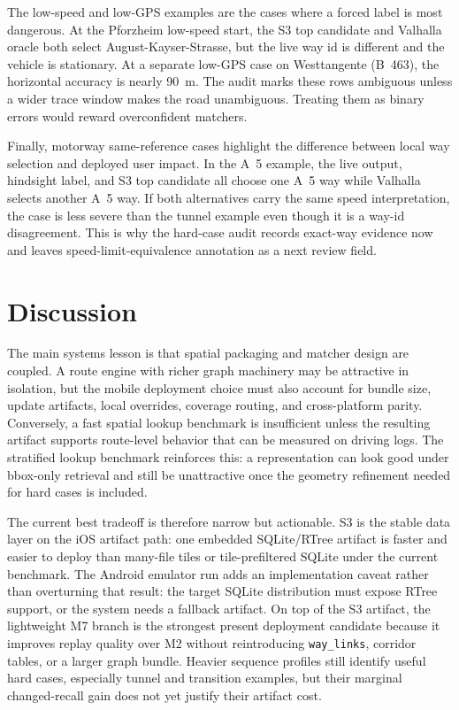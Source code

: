 \documentclass[sigconf]{acmart}
\begin{document}
The low-speed and low-GPS examples are the cases where a forced label is most dangerous. At the Pforzheim low-speed start, the S3 top candidate and Valhalla oracle both select August-Kayser-Strasse, but the live way id is different and the vehicle is stationary. At a separate low-GPS case on Westtangente (B~463), the horizontal accuracy is nearly \SI{90}{m}. The audit marks these rows ambiguous unless a wider trace window makes the road unambiguous. Treating them as binary errors would reward overconfident matchers.

Finally, motorway same-reference cases highlight the difference between local way selection and deployed user impact. In the A~5 example, the live output, hindsight label, and S3 top candidate all choose one A~5 way while Valhalla selects another A~5 way. If both alternatives carry the same speed interpretation, the case is less severe than the tunnel example even though it is a way-id disagreement. This is why the hard-case audit records exact-way evidence now and leaves speed-limit-equivalence annotation as a next review field.

\section{Discussion}

The main systems lesson is that spatial packaging and matcher design are coupled. A route engine with richer graph machinery may be attractive in isolation, but the mobile deployment choice must also account for bundle size, update artifacts, local overrides, coverage routing, and cross-platform parity. Conversely, a fast spatial lookup benchmark is insufficient unless the resulting artifact supports route-level behavior that can be measured on driving logs. The stratified lookup benchmark reinforces this: a representation can look good under bbox-only retrieval and still be unattractive once the geometry refinement needed for hard cases is included.

The current best tradeoff is therefore narrow but actionable. S3 is the stable data layer on the iOS artifact path: one embedded SQLite/RTree artifact is faster and easier to deploy than many-file tiles or tile-prefiltered SQLite under the current benchmark. The Android emulator run adds an implementation caveat rather than overturning that result: the target SQLite distribution must expose RTree support, or the system needs a fallback artifact. On top of the S3 artifact, the lightweight M7 branch is the strongest present deployment candidate because it improves replay quality over M2 without reintroducing \texttt{way\_links}, corridor tables, or a larger graph bundle. Heavier sequence profiles still identify useful hard cases, especially tunnel and transition examples, but their marginal changed-recall gain does not yet justify their artifact cost.
\end{document}
